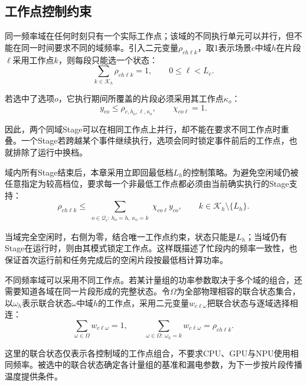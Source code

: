 \subsection{工作点控制约束}

同一频率域在任何时刻只有一个实际工作点；该域的不同执行单元可以并行，但不能在同一时间要求不同的域频率。引入二元变量$\rho_{ch\ell k}$，取1表示场景$c$中域$h$在片段$\ell$采用工作点$k$，则每段只能选一个状态：
\begin{equation}
\sum_{k\in\mathcal K_h}\rho_{ch\ell k}=1,
\qquad 0\le\ell<L_c.
\label{eq:domain-onehot}
\end{equation}

若选中了选项$o$，它执行期间所覆盖的片段必须采用其工作点$\kappa_o$：
\begin{equation}
y_{co}\le\rho_{c,h_o,\ell,\kappa_o},
\qquad \chi_{co\ell}=1.
\label{eq:active-lock}
\end{equation}

因此，两个同域Stage可以在相同工作点上并行，却不能在要求不同工作点时重叠。一个Stage若跨越某个事件继续执行，选项会同时锁定事件前后的工作点，也就排除了运行中换档。

域内所有Stage结束后，本章采用立即回最低档$L_h$的控制策略。为避免空闲域仍被任意指定为较高档位，要求每一个非最低工作点都必须由当前确实执行的Stage支持：
\begin{equation}
\rho_{ch\ell k}\le
\sum_{\substack{o\in\mathcal Q_c:\,h_o=h,\ \kappa_o=k}}
\chi_{co\ell}y_{co},\qquad k\in\mathcal K_h\setminus\{L_h\}.
\label{eq:idle-auto-low}
\end{equation}

当域完全空闲时，右侧为零，结合唯一工作点约束，状态只能是$L_h$；当域仍有Stage在运行时，则由其模式锁定工作点。这样既描述了忙段内的频率一致性，也保证首次运行前和任务完成后的空闲片段按最低档计算功率。

不同频率域可以采用不同工作点。若某计量组的功率参数取决于多个域的组合，还需要知道各域在同一片段形成的完整状态。令$\Omega$为全部物理相容的联合状态集合，以$\omega_h$表示联合状态$\omega$中域$h$的工作点，采用二元变量$w_{c\ell\omega}$把联合状态与逐域选择相连：
\begin{equation}
\sum_{\omega\in\Omega}w_{c\ell\omega}=1,\qquad
\sum_{\omega\in\Omega:\,\omega_h=k}w_{c\ell\omega}=\rho_{ch\ell k}.
\label{eq:joint-state}
\end{equation}

这里的联合状态仅表示各控制域的工作点组合，不要求CPU、GPU与NPU使用相同频率。被选中的联合状态确定各计量组的基准和漏电参数，为下一步按片段传播温度提供条件。

